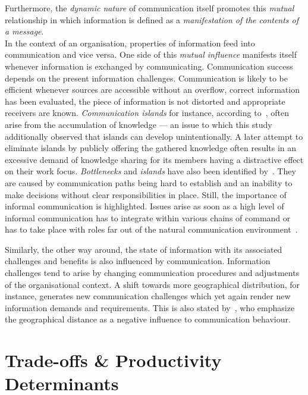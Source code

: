 Furthermore, the \emph{dynamic nature} of communication itself promotes this \emph{mutual} relationship in which information is defined as a \emph{manifestation of the contents of a message}.\\
In the context of an organisation, properties of information feed into communication and vice versa. One side of this \emph{mutual influence} manifests itself whenever information is exchanged by communicating. Communication success depends on the present information challenges. Communication is likely to be efficient whenever sources are accessible without an overflow, correct information has been evaluated, the piece of information is not distorted and appropriate receivers are known. \emph{Communication islands} for instance, according to~\citet{kettunen2008agileorg}, often arise from the accumulation of knowledge — an issue to which this study additionally observed that islands can develop unintentionally. A later attempt to eliminate islands by publicly offering the gathered knowledge often results in an excessive demand of knowledge sharing for its members having a distractive effect on their work focus. \emph{Bottlenecks} and \emph{islands} have also been identified by~\citet{curtis1988fieldstudysoftwaredesign}. They are caused by communication paths being hard to establish and an inability to make decisions without clear responsibilities in place. Still, the importance of informal communication is highlighted. Issues arise as soon as a high level of informal communication has to integrate within various chains of command or has to take place with roles far out of the natural communication environment~\citep{curtis1988fieldstudysoftwaredesign}.

Similarly, the other way around, the state of information with its associated challenges and benefits is also influenced by communication. Information challenges tend to arise by changing communication procedures and adjustments of the organisational context. A shift towards more geographical distribution, for instance, generates new communication challenges which yet again render new information demands and requirements. This is also stated by~\citet{kraut1995coordinationinsd}, who emphasize the geographical distance as a negative influence to communication behaviour. 

\section{Trade-offs \& Productivity Determinants}

